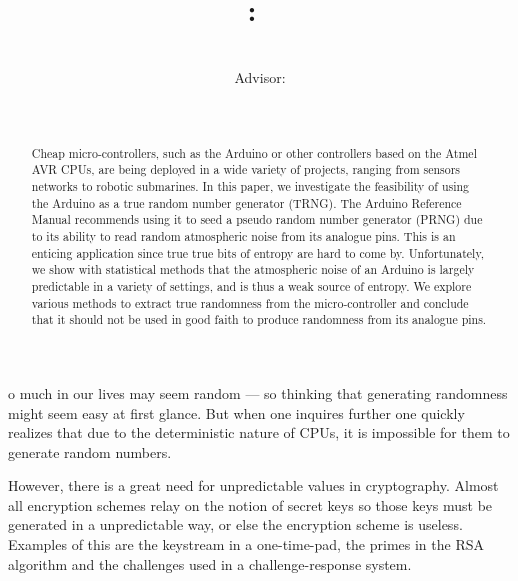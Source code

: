 \documentclass[a4paper]{article}           %
\title{
    \Class:\ \Title
    \ifthenelse{\equal{\SubTitle}{}}{}{\\{\SubTitle}}
    }
\date{\small{\DueLang\ \DueDate}}
\author{\AuthorName\\Advisor: \ClassInstructor}
\newcommand{\tmpsection}[1]{}
\let\tmpsection=\section
\renewcommand{\section}[2]{

    \ifthenelse{
      \equal{#2}{Heimildir} %
    }
    {
      \tmpsection{\sc{#1} }
      \tmpsection{\sc{#2} }
    }
    {\tmpsection{\sc{#1} } }
      

}
\begin{document}
\maketitle



\begin{abstract}

  Cheap micro-controllers, such as the Arduino or other controllers
  based on the Atmel AVR CPUs, are being deployed in a wide variety of
  projects, ranging from sensors networks to robotic submarines. In
  this paper, we investigate the feasibility of using the Arduino as a
  true random number generator (TRNG). The Arduino Reference Manual
  recommends using it to seed a pseudo random number generator (PRNG)
  due to its ability to read random atmospheric noise from its
  analogue pins. This is an enticing application since true true bits
  of entropy are hard to come by. Unfortunately, we show with
  statistical methods that the atmospheric noise of an Arduino is
  largely predictable in a variety of settings, and is thus a weak
  source of entropy. We explore various methods to extract true
  randomness from the micro-controller and conclude that it should not
  be used in good faith to produce randomness from its analogue pins.

\end{abstract}

\section{Introduction}

So much in our lives may seem random --- so thinking that generating randomness might seem easy at first glance. But when one inquires further one quickly realizes that due to the deterministic nature of CPUs, it is impossible for them to generate random numbers. 

However, there is a great need for unpredictable values in cryptography. Almost all encryption schemes relay on the notion of secret keys so those keys must be generated in a unpredictable way, or else the encryption scheme is useless. Examples of this are the keystream in a one-time-pad, the primes in the RSA algorithm and the challenges used in a challenge-response system\cite{menezes1996,anthes2011}.
\end{document}
